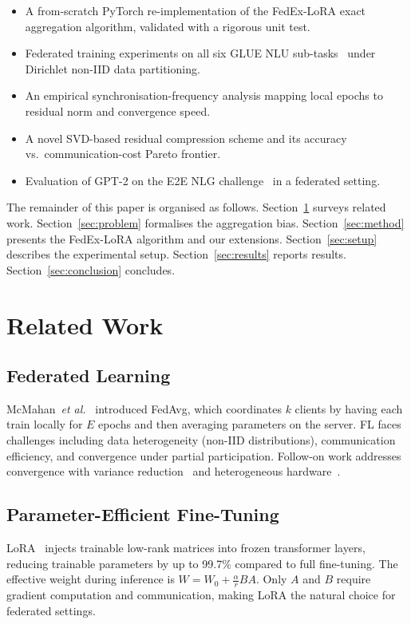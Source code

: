 \documentclass[conference]{IEEEtran}
\begin{document}
\begin{itemize}
  \item A from-scratch PyTorch re-implementation of the FedEx-LoRA exact
        aggregation algorithm, validated with a rigorous unit test.
  \item Federated training experiments on all six GLUE NLU
        sub-tasks~\cite{b_wang} under Dirichlet non-IID data partitioning.
  \item An empirical synchronisation-frequency analysis mapping local epochs
        to residual norm and convergence speed.
  \item A novel SVD-based residual compression scheme and its accuracy vs.\
        communication-cost Pareto frontier.
  \item Evaluation of GPT-2 on the E2E NLG challenge~\cite{b_novikova} in a
        federated setting.
\end{itemize}

The remainder of this paper is organised as follows.
Section~\ref{sec:related} surveys related work.
Section~\ref{sec:problem} formalises the aggregation bias.
Section~\ref{sec:method} presents the FedEx-LoRA algorithm and our extensions.
Section~\ref{sec:setup} describes the experimental setup.
Section~\ref{sec:results} reports results.
Section~\ref{sec:conclusion} concludes.

\section{Related Work}
\label{sec:related}

\subsection{Federated Learning}
McMahan~\emph{et al.}~\cite{b_mcmahan} introduced FedAvg, which coordinates
$k$ clients by having each train locally for $E$ epochs and then averaging
parameters on the server. FL faces challenges including data heterogeneity
(non-IID distributions), communication efficiency, and convergence under
partial participation. Follow-on work addresses convergence with variance
reduction~\cite{b_ravan} and heterogeneous hardware~\cite{b_flexlora}.

\subsection{Parameter-Efficient Fine-Tuning}
LoRA~\cite{b_hu} injects trainable low-rank matrices into frozen transformer
layers, reducing trainable parameters by up to 99.7\% compared to full
fine-tuning. The effective weight during inference is
$W = W_0 + \frac{\alpha}{r}BA$. Only $A$ and $B$ require gradient computation
and communication, making LoRA the natural choice for federated settings.
\end{document}
